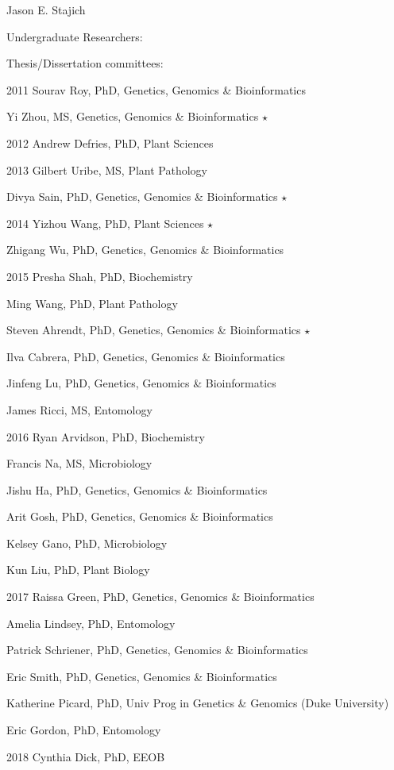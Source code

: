 \documentclass[10pt]{article}
\begin{document}
\begin{cv}{\centerline{Jason E. Stajich}}
\begin{cvlistcompact}{Undergraduate Researchers:}
\end{cvlistcompact}

\begin{cvlistcompact}{Thesis/Dissertation committees:}
\item [2011] Sourav Roy, PhD, Genetics, Genomics \& Bioinformatics
\item Yi Zhou, MS, Genetics, Genomics \& Bioinformatics $\star$
\item [2012] Andrew Defries, PhD, Plant Sciences
\item [2013] Gilbert Uribe, MS, Plant Pathology
\item Divya Sain, PhD, Genetics, Genomics \& Bioinformatics $\star$
\item [2014] Yizhou Wang, PhD, Plant Sciences $\star$
\item Zhigang Wu, PhD, Genetics, Genomics \& Bioinformatics
\item [2015] Presha Shah, PhD, Biochemistry
\item Ming Wang, PhD, Plant Pathology
\item Steven Ahrendt, PhD, Genetics, Genomics \& Bioinformatics $\star$
\item Ilva Cabrera, PhD, Genetics, Genomics \& Bioinformatics
\item Jinfeng Lu, PhD, Genetics, Genomics \& Bioinformatics
\item James Ricci, MS, Entomology
\item [2016] Ryan Arvidson, PhD, Biochemistry
\item Francis Na, MS, Microbiology
\item Jishu Ha, PhD, Genetics, Genomics \& Bioinformatics
\item Arit Gosh, PhD, Genetics, Genomics \& Bioinformatics
\item Kelsey Gano, PhD, Microbiology
\item Kun Liu, PhD, Plant Biology
\item [2017] Raissa Green, PhD, Genetics, Genomics \& Bioinformatics
\item Amelia Lindsey, PhD, Entomology
\item Patrick Schriener, PhD, Genetics, Genomics \& Bioinformatics
\item Eric Smith, PhD, Genetics, Genomics \& Bioinformatics
\item Katherine Picard, PhD, Univ Prog in Genetics \& Genomics (Duke University)
\item Eric Gordon, PhD, Entomology
\item [2018] Cynthia Dick, PhD, EEOB

\end{cvlistcompact}
\end{cv}
\end{document}
